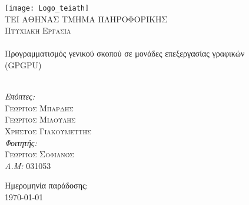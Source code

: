 \begin{titlepage}
\begin{center}

\texttt{[image: Logo\_teiath]}~\\[1cm]

\textsc{\LARGE ΤΕΙ ΑΘΗΝΑΣ ΤΜΗΜΑ ΠΛΗΡΟΦΟΡΙΚΗΣ}\\[1.5cm]

\textsc{\Large Πτυχιακή Εργασία}\\[0.5cm]

\HRule \\[0.4cm]
{\Large Προγραμματισμός γενικού σκοπού σε μονάδες επεξεργασίας γραφικών\\[0.4cm] (GPGPU)} \\[0.4cm]

\HRule \\[1.5cm]

\centering

\emph{Επόπτες:} \\
\textsc{Γεώργιος Μπαρδής}\\
\textsc{Γεώργιος Μιαούλης}\\
\textsc{Χρήστος Γιακουμεττής}\\[2.5cm]

\emph{Φοιτητής:}\\
\textsc{Γεώργιος Σοφιανός}\\
\emph{A.M:} 031053


\vfill

{Ημερομηνία παράδοσης: \\ \today}

\end{center}
\end{titlepage}